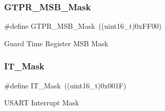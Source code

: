 \subsubsection{\texorpdfstring{GTPR\_MSB\_Mask}{GTPR\_MSB\_Mask}}
{\footnotesize\ttfamily \#define G\+T\+P\+R\+\_\+\+M\+S\+B\+\_\+\+Mask~((uint16\+\_\+t)0x\+F\+F00)}

Guard Time Register M\+SB Mask \mbox{\label{group___u_s_a_r_t___private___defines_ga401c753d4de6ab56fcb026c91b8c8487}} 
\subsubsection{\texorpdfstring{IT\_Mask}{IT\_Mask}}
{\footnotesize\ttfamily \#define I\+T\+\_\+\+Mask~((uint16\+\_\+t)0x001\+F)}

U\+S\+A\+RT Interrupt Mask 